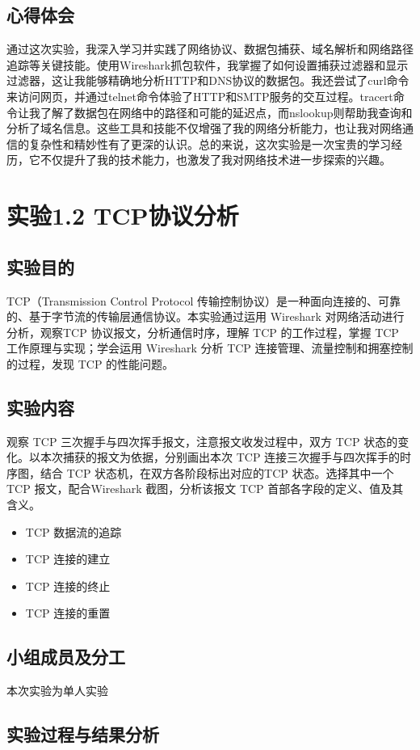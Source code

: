 \documentclass{article}
\begin{document}
\subsection{心得体会}
通过这次实验，我深入学习并实践了网络协议、数据包捕获、域名解析和网络路径追踪等关键技能。使用Wireshark抓包软件，我掌握了如何设置捕获过滤器和显示过滤器，这让我能够精确地分析HTTP和DNS协议的数据包。我还尝试了curl命令来访问网页，并通过telnet命令体验了HTTP和SMTP服务的交互过程。tracert命令让我了解了数据包在网络中的路径和可能的延迟点，而nslookup则帮助我查询和分析了域名信息。这些工具和技能不仅增强了我的网络分析能力，也让我对网络通信的复杂性和精妙性有了更深的认识。总的来说，这次实验是一次宝贵的学习经历，它不仅提升了我的技术能力，也激发了我对网络技术进一步探索的兴趣。

\newpage\section{实验1.2 TCP协议分析}
\subsection{实验目的}
TCP（Transmission Control Protocol 传输控制协议）是一种面向连接的、可靠的、基于字节流的传输层通信协议。本实验通过运用 Wireshark 对网络活动进行分析，观察TCP 协议报文，分析通信时序，理解 TCP 的工作过程，掌握 TCP 工作原理与实现；学会运用 Wireshark 分析 TCP 连接管理、流量控制和拥塞控制的过程，发现 TCP 的性能问题。
\subsection{实验内容}
观察 TCP 三次握手与四次挥手报文，注意报文收发过程中，双方 TCP 状态的变化。以本次捕获的报文为依据，分别画出本次 TCP 连接三次握手与四次挥手的时序图，结合 TCP 状态机，在双方各阶段标出对应的TCP 状态。选择其中一个TCP 报文，配合Wireshark 截图，分析该报文 TCP 首部各字段的定义、值及其含义。
\begin{itemize}
    \item TCP 数据流的追踪
    \item TCP 连接的建立
    \item TCP 连接的终止
    \item TCP 连接的重置
\end{itemize}
\subsection{小组成员及分工}
本次实验为单人实验
\subsection{实验过程与结果分析}
\end{document}
